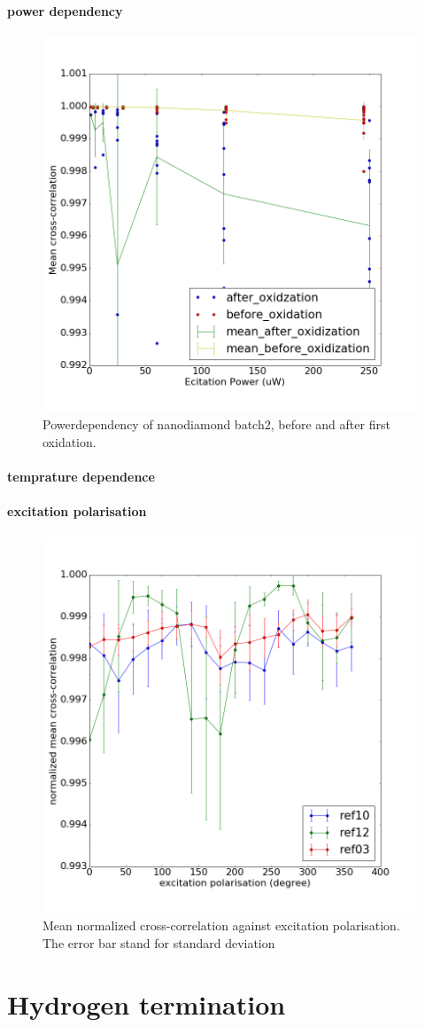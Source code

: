 \paragraph{power dependency}
\begin{figure}[h]
\centering
\includegraphics[width=0.7\linewidth]{Figures/pic/powerdependencybeforeafteroxidation}
\caption{Powerdependency of nanodiamond batch2, before and after first oxidation.}
\label{fig:powerdependencybeforeafteroxidation}
\end{figure}

\paragraph{temprature dependence}



\paragraph{excitation polarisation}


\begin{figure}[h]
\centering
\includegraphics[width=0.7\linewidth]{"Figures/pic/excitation polarisation"}
\caption{Mean normalized cross-correlation against excitation polarisation. The error bar stand for standard deviation}
\label{fig:excitation-polarisation of untreated nanodiamond batch 2}
\end{figure}

\section{Hydrogen termination}


